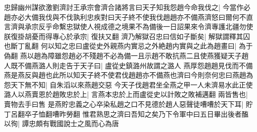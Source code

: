忠歸幽州謀欲激劉濟討王承宗會濟合諸將言曰天子知我怨趙今命我伐之|{
	今當作必}
趙亦必大備我伐與不伐孰利忠疾對曰天子終不使我伐趙趙亦不備燕濟怒曰爾何不直言濟與承宗反乎命繫忠獄使人視成德之境果不為備後一日詔果來令濟專護北疆勿使朕復掛胡憂而得專心於承宗|{
	復扶又翻}
濟乃解獄召忠曰信如子斷矣|{
	解獄謂釋其囚也斷丁亂翻}
何以知之忠曰盧從史外親燕内實忌之外絶趙内實與之此為趙畫曰|{
	為于偽翻}
燕以趙為障雖怨趙必不殘趙不必為備一且示趙不敢抗燕二且使燕獲疑天子趙人既不備燕潞人則走告于天子曰|{
	盧從史鎮潞州故謂之潞人}
燕厚怨趙趙見伐而不備燕是燕反與趙也此所以知天子終不使君伐趙趙亦不備燕也濟曰今則奈何忠曰燕趙為怨天下無不知|{
	自朱滔以來燕趙交惡}
今天子伐趙君坐全燕之甲一人未濟易水此正使潞人以燕賣恩於趙敗忠於上|{
	言燕本忠於上而盧從史以計敗之敗補邁翻}
兩皆售也|{
	賣物去手曰售}
是燕貯忠義之心卒染私趙之口不見德於趙人惡聲徒嘈嘈於天下耳|{
	貯丁呂翻卒子恤翻嘈昨勞翻}
惟君熟思之濟曰吾知之矣乃下令軍中曰五日畢出後者醢以徇|{
	譚忠頗有戰國說士之風而心為唐}


